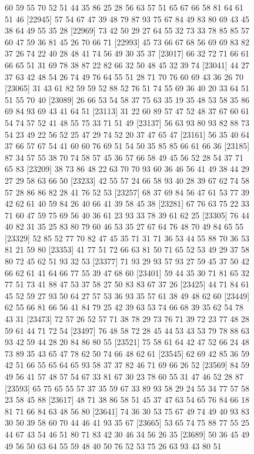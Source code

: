 \documentclass{article}
\begin{document}
\begin{figure}[H]
\begin{Schunk}
\begin{Soutput}
[22921] 60 59 55 70 52 51 44 35 86 25 28 56 63 57 51 65 67 66 58 81 64 61 51 46
[22945] 57 54 67 47 39 48 79 87 93 75 67 84 49 83 80 69 43 45 38 64 49 55 35 28
[22969] 73 42 50 29 27 64 55 32 73 33 78 85 85 57 60 47 59 36 81 45 26 70 66 71
[22993] 45 73 66 67 68 56 69 69 83 82 37 26 74 22 40 28 48 41 74 56 49 30 35 37
[23017] 66 32 72 71 66 61 66 65 51 31 69 78 38 87 22 82 66 32 50 48 45 32 39 74
[23041] 44 27 37 63 42 48 54 26 74 49 76 64 55 51 28 71 70 76 60 69 43 36 26 70
[23065] 31 43 61 82 59 59 52 88 52 76 51 74 55 69 36 40 20 33 64 51 51 55 70 40
[23089] 26 66 53 54 58 37 75 63 35 19 35 48 53 58 35 86 69 84 93 69 43 41 64 51
[23113] 31 22 60 89 57 47 52 48 37 67 60 61 54 74 57 52 41 48 55 75 33 71 51 49
[23137] 56 63 93 80 93 82 88 73 54 23 49 22 56 52 25 47 29 74 52 20 37 47 65 47
[23161] 56 35 40 64 37 66 57 67 54 41 60 60 76 69 51 54 50 35 85 85 66 61 66 36
[23185] 87 34 57 55 38 70 74 58 57 45 36 57 66 58 49 45 56 52 28 54 37 71 65 83
[23209] 38 73 86 48 22 63 70 70 93 60 36 46 56 41 49 38 44 29 27 29 58 63 66 50
[23233] 42 55 57 24 66 58 93 40 28 39 67 62 74 58 57 28 86 86 82 28 41 76 52 53
[23257] 68 37 69 84 56 47 61 53 77 39 42 62 61 40 59 84 26 40 66 41 39 58 45 38
[23281] 67 76 63 75 22 33 71 60 47 59 75 69 56 40 36 61 23 93 33 78 39 61 62 25
[23305] 76 44 40 82 31 35 25 83 80 79 60 46 53 35 27 67 64 76 48 70 49 84 65 55
[23329] 52 85 52 77 70 82 47 45 35 71 31 71 36 53 44 55 88 70 36 53 81 21 59 80
[23353] 41 77 51 72 66 63 81 50 71 65 52 53 49 29 37 58 80 72 45 62 51 93 32 53
[23377] 71 93 29 93 57 93 27 59 45 37 50 42 66 62 61 41 64 66 77 55 39 47 68 60
[23401] 59 44 35 30 71 81 65 32 77 51 73 41 88 47 53 37 58 27 50 83 83 67 37 26
[23425] 44 71 84 61 45 52 59 27 93 50 64 27 57 53 36 93 35 57 61 38 49 48 62 60
[23449] 62 55 66 81 66 56 41 84 79 25 42 39 63 53 74 66 68 39 35 62 54 78 43 31
[23473] 72 57 26 52 57 71 38 78 29 73 76 71 39 72 23 77 48 28 59 61 44 71 72 54
[23497] 76 48 58 72 28 45 44 53 43 53 79 78 88 63 93 42 59 44 28 20 84 86 80 55
[23521] 75 58 61 64 42 47 52 66 24 48 73 89 35 43 65 47 78 62 50 74 66 48 62 61
[23545] 62 69 42 85 36 59 42 51 66 55 65 64 65 93 58 37 37 82 46 71 69 66 26 52
[23569] 84 59 49 56 41 57 48 57 54 67 33 81 67 30 23 78 60 55 31 47 46 52 28 87
[23593] 65 75 65 55 57 37 35 59 67 33 89 93 58 29 24 55 34 77 57 58 23 58 45 88
[23617] 48 71 38 86 58 51 45 37 47 63 54 65 76 84 66 18 81 71 66 84 63 48 56 80
[23641] 74 36 30 53 75 67 49 74 49 40 93 83 30 50 39 58 60 70 44 46 41 93 35 67
[23665] 53 65 74 75 88 77 55 25 44 67 43 54 46 51 80 71 83 42 30 46 34 56 26 35
[23689] 50 36 45 49 49 56 50 63 64 55 59 48 40 50 76 52 53 75 26 63 93 43 80 51

\end{Soutput}
\end{Schunk}
\end{figure}
\end{document}
